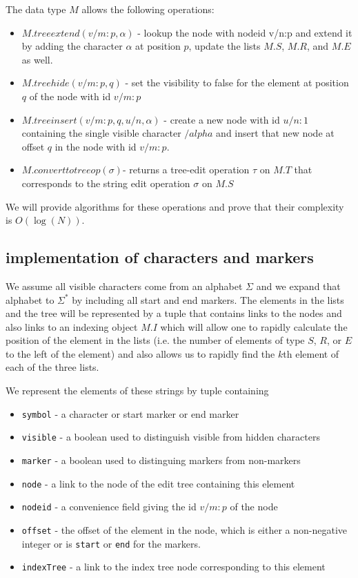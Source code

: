 \documentclass{amsart}
\begin{document}
The data type $M$ allows the following operations:
\begin{itemize}
\item $M.treeextend(v/m:p,\alpha)$ - lookup the node with nodeid v/n:p and extend it by adding the character $\alpha$ at position $p$, update the lists $M.S$, $M.R$, and $M.E$ as well.
\item $M.treehide(v/m:p,q)$ - set the visibility to false for the element at position $q$ of the node with id $v/m:p$
\item $M.treeinsert(v/m:p,q,u/n,\alpha)$ - create a new node with id $u/n:1$ containing the single visible character $/alpha$ and insert that new node at offset $q$ in the node with id $v/m:p$.
\item $M.converttotreeop(\sigma)$- returns a tree-edit operation $\tau$ on $M.T$ that corresponds to the string edit operation $\sigma$ on $M.S$
\end{itemize}
We will provide algorithms for these operations and prove that their complexity is $O(\log(N))$.
\subsection{implementation of characters and markers}
We assume all visible characters come from an alphabet $\Sigma$
and we expand that alphabet to $\Sigma^*$ by including all start and end markers.
The elements in the lists and the tree will be represented by a tuple that contains links to the nodes and also links to an indexing object $M.I$ which will allow one to rapidly calculate the position of the element in the lists (i.e. the number of elements of type $S$, $R$, or $E$ to the left of the element) and also allows us to rapidly find the $k$th element of each of the three lists.

We represent the elements of these strings by tuple containing
\begin{itemize}
\item {\tt symbol} - a character or start marker or end marker 
\item {\tt visible} - a boolean used to distinguish visible from hidden characters
\item {\tt marker} - a boolean used to distinguing markers from non-markers
\item {\tt node} - a link to the node of the edit tree containing this element
\item {\tt nodeid} - a convenience field giving the id $v/m:p$ of the node
\item {\tt offset} - the offset of the element in the node, which is either a non-negative integer or is {\tt start} or {\tt end} for the markers.
\item {\tt indexTree} - a link to the index tree node corresponding to this element
\end{itemize}
\end{document}

